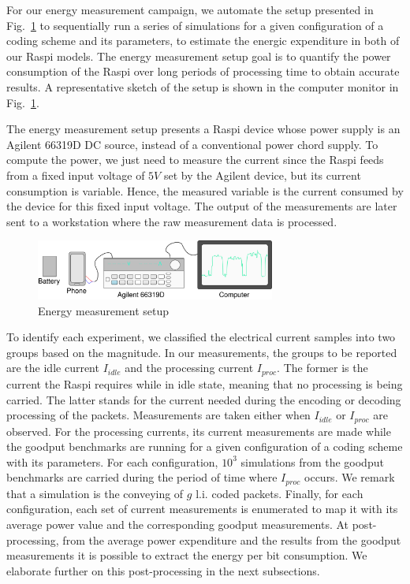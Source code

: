 For our energy measurement campaign, we automate the setup presented
in Fig.~\ref{fig:measurement_setup} to sequentially run a series of
simulations for a given configuration of a coding scheme and its parameters,
to estimate the energic expenditure in both of our \ac{Raspi}
models. The energy measurement setup goal is to quantify the power
consumption of the \ac{Raspi} over long periods of processing time to
obtain accurate results. A representative sketch of the setup is shown
in the computer monitor in Fig.~\ref{fig:measurement_setup}. 

The energy measurement setup presents a \ac{Raspi} device whose power
supply is an Agilent 66319D \ac{DC} source, instead of a conventional
power chord supply.   To compute the power, we just need to measure
the current since the \ac{Raspi} feeds from a fixed input voltage of $5V$
set by the Agilent device, but its current consumption is variable.
Hence, the measured variable is the current consumed by the device for
this fixed input voltage. The output of the measurements
are later sent to a workstation where the raw measurement data is processed.

\begin{figure}[ht!]
\centering
\includegraphics[width=0.7\textwidth]{images/measurement_setup.eps}
\caption{Energy measurement setup}
\label{fig:measurement_setup}
\end{figure}

To identify each experiment, we classified the electrical current samples
into two groups based on the magnitude. In our measurements, the groups to
be reported are the idle current $I_{idle}$ and the processing current
$I_{proc}$. The former is the current the \ac{Raspi} requires while in idle
state, meaning that no processing is being carried. The latter stands for
the current needed during the encoding or decoding processing of the packets.
Measurements are taken either when $I_{idle}$ or $I_{proc}$ are observed.
For the processing currents, its current measurements are made while the
goodput benchmarks are running for a given configuration of a coding scheme
with its parameters. For each configuration, $10^3$ simulations from the
goodput benchmarks are carried during the period of time where $I_{proc}$
occurs. We remark that a simulation is the conveying of $g$ \ac{l.i.} coded
packets. Finally, for each configuration, each set of current measurements is
enumerated to map it with its average power value and the corresponding goodput
measurements. At post-processing, from the average power expenditure and the
results from the goodput measurements it is possible to extract the energy
per bit consumption. We elaborate further on this post-processing in the
next subsections.


